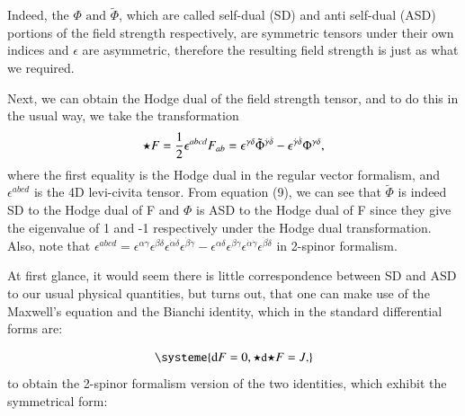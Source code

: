 \documentclass{article}
\begin{document}
Indeed, the $ \Phi \text{ and } \tilde \Phi $, which are called self-dual
(SD) and anti self-dual (ASD) portions of the field strength respectively, are symmetric tensors under their
own indices and $ \epsilon $
are asymmetric, therefore the resulting field strength is just as what we
required. 

Next, we can obtain the Hodge dual of the field strength tensor, and to do
this in the usual way, we take the transformation 
\begin{align}
  \label{dual field strength in 2 spinor formalism}
       \small{\star} F =
    \frac{1}{2} \epsilon^{abcd} F_{ab} = \epsilon^{\gamma \delta} \tilde
    \Phi^{\dot{\gamma} \dot{\delta}} - \epsilon^{\dot{\gamma}
    \dot{\delta}} \Phi^{\gamma \delta}, 
\end{align} 
where the first equality is the Hodge dual in the regular vector formalism,
and $ \epsilon^{abcd} $ is the 4D levi-civita tensor. From equation
(9), we can see that $\tilde \Phi$ is indeed SD to the Hodge dual of F and $
\Phi $ is ASD to the Hodge dual of F since they give the eigenvalue
of 1 and -1 respectively under the Hodge dual transformation. Also, note
that $ \epsilon^{abcd} = \epsilon^{\alpha \gamma}
\epsilon^{\beta \delta}
\epsilon^{\dot{\alpha} \dot{\delta}}
\epsilon^{\dot{\beta} \dot{\gamma}}
- \epsilon^{\alpha \delta} \epsilon^{\beta \gamma}
\epsilon^{\dot{\alpha} \dot{\gamma}}
\epsilon^{\dot{\beta} \dot{\delta}}$ in 2-spinor formalism.  

At first glance, it would seem there is little correspondence between SD and ASD
to our usual physical quantities, but turns out, that one can make use of the
Maxwell's equation and the Bianchi identity, which in the standard
differential forms are:

\begin{align}
  \label{standard maxwell in differential form}
  \systeme{
               \textnormal{d}F = 0,
   \small{\star} \textnormal{d} \small{\star}F = J\text{,}
  }
\end{align}
to obtain the 2-spinor formalism version of the two identities, which
exhibit the symmetrical form:
\end{document}
